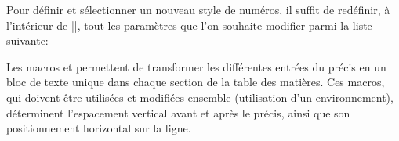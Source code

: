 \begin{noprint}
\newcommand{\makeprecisstyle}[2]{\expandafter\gdef\csname @precisstyle@#1\endcsname{#2}}
\newcommand{\precisstyle}[1]{\csname @precisstyle@#1\endcsname}
\end{noprint}

Pour définir et sélectionner un nouveau style de numéros, il suffit de redéfinir, à l'intérieur de |\makeparastyle|, tout les paramètres que l'on souhaite modifier parmi la liste suivante:

\begin{macro}
\end{macro}

\begin{noprint}
\newcommand{\cftprecisstyle}{}
\newcommand{\cftprecisnumstyle}{}
\newcommand{\cftprecisaftersnum}{}
\newcommand{\cftprecisnumsep}{}
\newcommand{\cftprecisleader}{}
\newcommand{\cftprecisafterpnum}{}
\newcommand{\cftprecissep}{ }
\end{noprint}


\begin{developer}
Les macros  et  permettent de transformer les différentes entrées du précis en un bloc de texte unique dans chaque section de la table des matières. Ces macros, qui doivent être utilisées et modifiées ensemble (utilisation d'un environnement), déterminent l'espacement vertical avant et après le précis, ainsi que son positionnement horizontal sur la ligne.
\end{developer}


